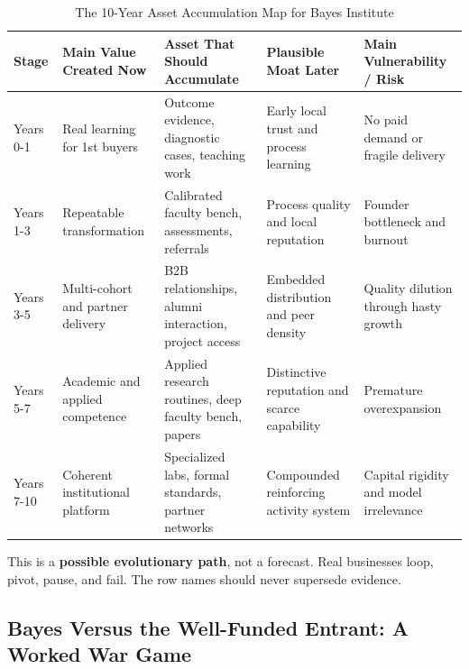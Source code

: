 \begin{table}[t]
\centering
\small
\caption{The 10-Year Asset Accumulation Map for Bayes Institute}
\label{tab:bayes_asset_map}
\begin{tabularx}{\textwidth}{l p{3.2cm} p{3.6cm} p{3.2cm} X}
\toprule
\textbf{Stage} & \textbf{Main Value Created Now} & \textbf{Asset That Should Accumulate} & \textbf{Plausible Moat Later} & \textbf{Main Vulnerability / Risk} \\
\midrule
Years 0-1 & Real learning for 1st buyers & Outcome evidence, diagnostic cases, teaching work & Early local trust and process learning & No paid demand or fragile delivery \\
\addlinespace[2pt]
Years 1-3 & Repeatable transformation & Calibrated faculty bench, assessments, referrals & Process quality and local reputation & Founder bottleneck and burnout \\
\addlinespace[2pt]
Years 3-5 & Multi-cohort and partner delivery & B2B relationships, alumni interaction, project access & Embedded distribution and peer density & Quality dilution through hasty growth \\
\addlinespace[2pt]
Years 5-7 & Academic and applied competence & Applied research routines, deep faculty bench, papers & Distinctive reputation and scarce capability & Premature overexpansion \\
\addlinespace[2pt]
Years 7-10 & Coherent institutional platform & Specialized labs, formal standards, partner networks & Compounded reinforcing activity system & Capital rigidity and model irrelevance \\
\bottomrule
\end{tabularx}
\end{table}

This is a \textbf{possible evolutionary path}, not a forecast. Real businesses loop, pivot, pause, and fail. The row names should never supersede evidence.

\subsection{Bayes Versus the Well-Funded Entrant: A Worked War Game}
\label{sec:bayes_vs_well_funded_entrant}

